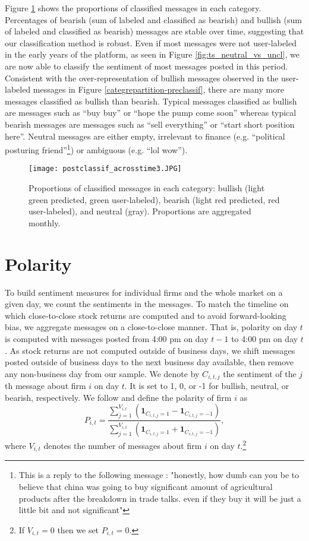 Figure \ref{fig:postclassif_acrosstime} shows the proportions of classified messages in each category. Percentages of bearish (sum of labeled and classified as bearish) and bullish (sum of labeled and classified as bearish) messages are stable over time, suggesting that our classification method is robust. Even if most messages were not user-labeled in the early years of the platform, as seen in Figure \ref{fig:ts_neutral_vs_uncl}, we are now able to classify the sentiment of most messages posted in this period. Consistent with the over-representation of bullish messages observed in the user-labeled messages in Figure \ref{categrepartition-preclassif}, there are many more messages classified as bullish than bearish. Typical messages classified as bullish are messages such as “buy buy” or “hope the pump come soon” whereas typical bearish messages are messages such as “sell everything” or “start short position here”. Neutral messages are either empty, irrelevant to finance (e.g. “political posturing friend”\footnote{This is a reply to the following message : "honestly, how dumb can you be to believe that china was going to buy significant amount of agricultural products after the breakdown in trade talks. even if they buy it will be just a little bit and not significant"}) or ambiguous (e.g. “lol wow”).
 

\begin{figure}[h]
    \centering
    \texttt{[image: postclassif\_acrosstime3.JPG]}
    \caption{Proportions of classified messages in each category: bullish (light green predicted, green user-labeled), bearish (light red predicted, red user-labeled), and neutral (gray). Proportions are aggregated monthly.}
    \label{fig:postclassif_acrosstime}
\end{figure}


\section{Polarity}\label{S:polarity}

To build sentiment measures for individual firms and the whole market on a given day, we count the sentiments in the messages. To match the timeline on which close-to-close stock returns are computed and to avoid forward-looking bias, we aggregate messages on a close-to-close manner. That is, polarity on day $t$ is computed with messages posted from 4:00 pm on day $t-1$ to 4:00 pm on day $t$. As stock returns are not computed outside of business days, we shift messages posted outside of business days to the next business day available, then remove any non-business day from our sample. We denote by $C_{i,t,j}$ the sentiment of the $j$th message about firm $i$ on day $t$. It is set to 1, 0, or -1 for bullish, neutral, or bearish, respectively. We follow \citet{ranco2015effects} and define the polarity of firm $i$ as
\[    P_{i,t} = \dfrac{\sum_{j=1}^{V_{i,t}} (\textbf{1}_{C_{i,t,j} = 1} - \textbf{1}_{C_{i,t,j} = -1})}{\sum_{j=1}^{V_{i,t}} (\textbf{1}_{C_{i,t,j} = 1} + \textbf{1}_{C_{i,t,j} = -1})},\]
where $V_{i,t}$ denotes the number of messages about firm $i$ on day $t$.\footnote{If $V_{i,t}=0$ then we set $P_{i,t} =0$.}

